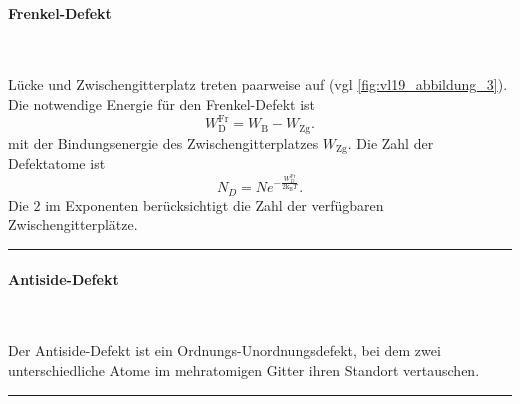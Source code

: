 \paragraph{Frenkel-Defekt}\,\\[1em]
	\begin{minipage}{0.65\linewidth}
		Lücke und Zwischengitterplatz treten paarweise auf (vgl \autoref{fig:vl19_abbildung_3}). Die notwendige Energie für den Frenkel-Defekt ist
		$$
			W_\mathrm{D}^{\text{Fr}} = W_\mathrm{B} - W_\mathrm{Zg}.
		$$
		mit der Bindungsenergie des Zwischengitterplatzes $W_\mathrm{Zg}$. Die Zahl der Defektatome ist
		$$
			N_{D} = N e^{- \frac{W_{D}^{\text{Fr}}}{2 \mathrm{k}_{\mathrm{B}} T}}.
		$$
		Die $2$ im Exponenten berücksichtigt die Zahl der verfügbaren Zwischengitterplätze.
	\end{minipage}
	\hfill
	\begin{minipage}{0.25\linewidth}
		\centering
		\label{fig:vl19_abbildung_3}
	\end{minipage}
	\vspace{1em}
	\hrule

\paragraph{Antiside-Defekt}\,\\[1em]
	\begin{minipage}{0.25\linewidth}
		\centering
		\label{fig:vl19_abbildung_4}
	\end{minipage}
	\hfill
	\begin{minipage}{0.65\linewidth}
		Der Antiside-Defekt ist ein Ordnungs-Unordnungsdefekt, bei dem zwei unterschiedliche Atome im mehratomigen Gitter ihren Standort vertauschen. 
	\end{minipage}
	\vspace{1em}
	\hrule

